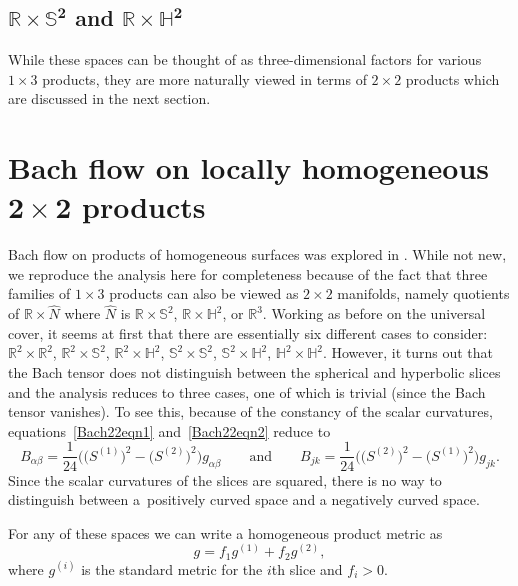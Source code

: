 \documentclass[pdftex]{sigma}
\numberwithin{equation}{section}
\begin{document}
\subsection[$\mathbb{R} \times \mathbb{S}^2$ and $\mathbb{R} \times \mathbb{H}^2$]{$\boldsymbol{\mathbb{R} \times \mathbb{S}^2}$ and $\boldsymbol{\mathbb{R} \times \mathbb{H}^2}$}

While these spaces can be thought of as three-dimensional factors for various $1 \times 3$ products, they are more naturally viewed in terms of $2 \times 2$ products which are discussed in the next section.

\section[Bach flow on locally homogeneous $2 \times 2$ products]{Bach flow on locally homogeneous $\boldsymbol{2 \times 2}$ products} \label{22flowsec}

Bach flow on products of homogeneous surfaces was explored in \cite{DasKar}. While not new, we reproduce the analysis here for completeness because of the fact that three families of $1 \times 3$ products can also be viewed as $2 \times 2$ manifolds, namely quotients of $\mathbb{R} \times \widehat{N}$ where $\widehat{N}$ is $\mathbb{R} \times \mathbb{S}^2$, $\mathbb{R} \times\mathbb{H}^2$, or $\mathbb{R}^3$. Working as before on the universal cover, it seems at first that there are essentially six different cases to consider: $\mathbb{R}^2 \times \mathbb{R}^2$, $\mathbb{R}^2 \times \mathbb{S}^2$, $\mathbb{R}^2 \times \mathbb{H}^2$, $\mathbb{S}^2 \times \mathbb{S}^2$, $\mathbb{S}^2 \times \mathbb{H}^2$, $\mathbb{H}^2 \times \mathbb{H}^2$. However, it turns out that the Bach tensor does not distinguish between the spherical and hyperbolic slices and the analysis reduces to three cases, one of which is trivial (since the Bach tensor vanishes). To see this, because of the constancy of the scalar curvatures, equations~\eqref{Bach22eqn1} and~\eqref{Bach22eqn2} reduce to
\[
B_{\alpha \beta} = \frac{1}{24} \big(\big(S^{(1)}\big)^2 - \big(S^{(2)}\big)^2 \big) g_{\alpha \beta}
\qquad \text{and} \qquad
B_{jk} = \frac{1}{24} \big(\big(S^{(2)}\big)^2 - \big(S^{(1)}\big)^2 \big) g_{jk}.
\]
Since the scalar curvatures of the slices are squared, there is no way to distinguish between a~positively curved space and a negatively curved space.

For any of these spaces we can write a homogeneous product metric as
\[
g = f_1 g^{(1)} + f_2 g^{(2)},
\]
where $g^{(i)}$ is the standard metric for the $i$th slice and $f_i > 0$.
\end{document}
